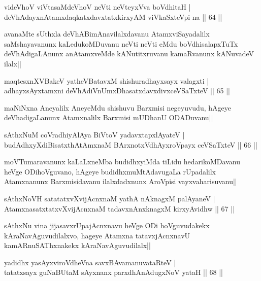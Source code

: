 \begin{shl}
videVhoV viVtasaMdeVhoV neVti neVteyxVva boVdhitaH |\\
deVhAdayxnAtamxdaqkatxdavxtatxkirxyAM viVkaSxteV\s pi na \hfill || 64 ||
\end{shl}

\begin{artha}
avanaMte sUthxla deVhABimAnavilalxdavanu AtamxviSayadalilx saMshayavanunx kaLedukoMDuvanu neVti neVti eMdu boVdhisalapxTuTx deVhAdigaLAnunx anAtamxveMde kANutitxruvanu kamaRvanunx kANuvadeV ilalx||
\end{artha}

\begin{shl}
maqtesxnXVBakeV yatheVBatavxM shishuradhayxsayx valagxti |\\
adhayxsAyx\s \s tamxni deVhAdiVnUmxDhasatxdavxdivxceVSaTxteV \hfill || 65 ||
\end{shl}

\begin{artha}
maNiNxna Aneyalilx AneyeMdu shishuvu Barxmisi negeyuvudu, hAgeye deVhadigaLanunx Atamxnalilx Barxmisi mUDhanU ODADuvanu||
\end{artha}

\begin{shl}
sAthxNuM coVradhiyA\s \s lAya BiVtoV yadavxtapxlAyateV |\\
budAdhxyXdiBisatxthA\s \s tAmxnaM BArxnotxV\s dhAyxroVpayx ceVSaTxteV \hfill || 66 ||
\end{shl}

\begin{artha}
moVTumaravanunx kaLaLxneMba budidhxyiMda tiLidu hedarikoMDavanu heVge ODihoVguvano, hAgeye budidhxmuMtAdavugaLa rUpadalilx Atamxnanunx Barxmisidavanu ilalxdadxnunx AroVpisi vayxvaharisuvanu||
\end{artha}

\begin{shl}
sAthxNoVH satatatxvXvijAcnxnaM yathA nAknagxM palAyaneV |\\
AtamxnasatxtatxvXvijAcnxnaM tadavxnAnxknagxM kirxyAvidhw \hfill || 67 ||
\end{shl}

\begin{artha}
sAthxNu vina jijasavxrUpajAcnxnavu heVge ODi hoVguvudakekx kAraNavAguvudilalxvo, hageye Atamxna tatavxjAcnxnavU kamARnuSAThxnakekx kAraNavAguvudilalx||
\end{artha}

\begin{shl}
yadidhx yasAyxviroVdheVna savxBAvamanuvataRteV |\\
tatatxsayx guNaBUtaM sAyxnanx parxdhAnAdugxNoV yataH \hfill || 68 ||
\end{shl}

